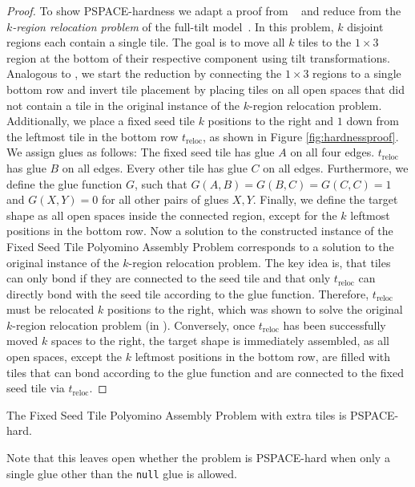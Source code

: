 \begin{proof}
To show PSPACE-hardness we adapt a proof from ~\cite{Caballero2020a} and reduce from the \emph{$k$-region relocation problem} of the full-tilt model~\cite{BalanzaMartinez2020}. In this problem, $k$ disjoint regions each contain a single tile. The goal is to move all $k$ tiles to the $1 \times 3$ region at the bottom of their respective component using tilt transformations. Analogous to \cite{Caballero2020a}, we start the reduction by connecting the $1 \times 3$ regions to a single bottom row and invert tile placement by placing tiles on all open spaces that did not contain a tile in the original instance of the $k$-region relocation problem. Additionally, we place a fixed seed tile $k$ positions to the right and $1$ down from the leftmost tile in the bottom row $t_{\text{reloc}}$, as shown in Figure \ref{fig:hardnessproof}. We assign glues as follows: The fixed seed tile has glue $A$ on all four edges. $t_{\text{reloc}}$ has glue $B$ on all edges. Every other tile has glue $C$ on all edges. Furthermore, we define the glue function $G$, such that $G(A,B) = G(B,C) = G(C,C) = 1$ and $G(X, Y) = 0$ for all other pairs of glues $X, Y$. Finally, we define the target shape as all open spaces inside the connected region, except for the $k$ leftmost positions in the bottom row. Now a solution to the constructed instance of the Fixed Seed Tile Polyomino Assembly Problem corresponds to a solution to the original instance of the $k$-region relocation problem. The key idea is, that tiles can only bond if they are connected to the seed tile and that only $t_{\text{reloc}}$ can directly bond with the seed tile according to the glue function. Therefore, $t_{\text{reloc}}$ must be relocated $k$ positions to the right, which was shown to solve the original $k$-region relocation problem (in \cite{Caballero2020a}). Conversely, once $t_{\text{reloc}}$ has been successfully moved $k$ spaces to the right, the target shape is immediately assembled, as all open spaces, except the $k$ leftmost positions in the bottom row, are filled with tiles that can bond according to the glue function and are connected to the fixed seed tile via $t_{\text{reloc}}$.
\end{proof}

\begin{corollary}
The Fixed Seed Tile Polyomino Assembly Problem with extra tiles is PSPACE-hard.
\end{corollary}

Note that this leaves open whether the problem is PSPACE-hard when only a single glue other than the \texttt{null} glue is allowed.

